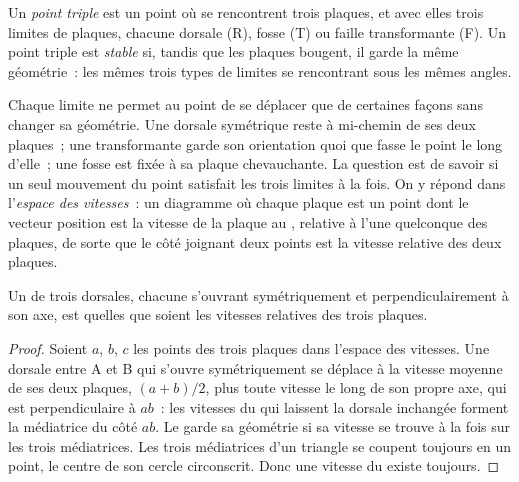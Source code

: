 \begin{definition}\label{def:b1:plate-kinematics:triple-junction}
Un \emph{point triple} est un point où se rencontrent trois plaques, et avec elles trois limites de plaques, chacune
dorsale (R), fosse (T) ou faille
transformante (F). Un point triple est \emph{stable} si, tandis que les plaques
bougent, il garde la même géométrie~: les mêmes trois types de limites se rencontrant sous les
mêmes angles.
\end{definition}

Chaque limite ne permet au point de se déplacer que de certaines façons sans changer
sa géométrie. Une dorsale symétrique reste à mi-chemin de ses deux plaques~; une
transformante garde son orientation quoi que fasse le point le long d'elle~; une fosse est
fixée à sa plaque chevauchante. La question est de savoir si un seul mouvement du
point satisfait les trois limites à la fois. On y répond dans
l'\emph{espace des vitesses}~: un diagramme où chaque plaque est un point dont le vecteur
position est la vitesse de la plaque au , relative à l'une quelconque des plaques, de sorte
que le côté joignant deux points est la vitesse relative des deux plaques.

\begin{proposition}\label{prop:b1:plate-kinematics:rrr}
Un  de trois dorsales, chacune s'ouvrant symétriquement et perpendiculairement à
son axe, est  quelles que soient les vitesses relatives des trois plaques.
\end{proposition}

\begin{proof}
Soient $a$, $b$, $c$ les points des trois plaques dans l'espace des vitesses. Une dorsale
entre A et B qui s'ouvre symétriquement se déplace à la vitesse moyenne de ses
deux plaques, $(a + b)/2$, plus toute vitesse le long de son propre axe, qui est
perpendiculaire à $ab$~: les vitesses du  qui laissent la dorsale
inchangée forment la médiatrice du côté $ab$. Le  garde
sa géométrie si sa vitesse se trouve à la fois sur les trois médiatrices.
Les trois médiatrices d'un triangle se coupent toujours en un point, le
centre de son cercle circonscrit. Donc une vitesse du 
existe toujours.
\end{proof}

